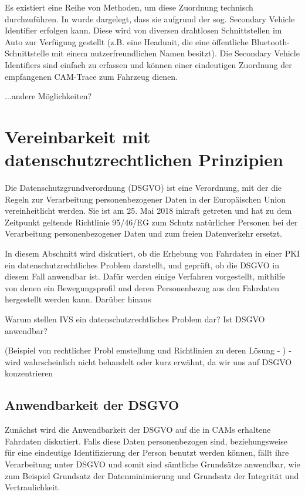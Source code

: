 Es existiert eine Reihe von Methoden, um diese Zuordnung technisch durchzuführen. In \cite{Ullmann2016} wurde dargelegt, dass sie aufgrund der sog. Secondary Vehicle Identifier erfolgen kann. Diese wird von diversen drahtlosen Schnittstellen im Auto zur Verfügung gestellt (z.B. eine Headunit, die eine öffentliche Bluetooth-Schnittstelle mit einem nutzerfreundlichen Namen besitzt). Die Secondary Vehicle Identifiers sind einfach zu erfassen und können einer eindeutigen Zuordnung der empfangenen CAM-Trace zum Fahrzeug dienen. 


...andere Möglichkeiten?


\section{Vereinbarkeit mit datenschutzrechtlichen Prinzipien}
\label{ch:SecondContentSection}

Die Datenschutzgrundverordnung (DSGVO) ist eine Verordnung, mit der die Regeln zur Verarbeitung personenbezogener Daten in der Europäischen Union vereinheitlicht werden. Sie ist am 25. Mai 2018 inkraft getreten und hat zu dem Zeitpunkt geltende Richtlinie 95/46/EG zum Schutz natürlicher Personen bei der Verarbeitung personenbezogener Daten und zum freien Datenverkehr ersetzt. 

In diesem Abschnitt wird diskutiert, ob die Erhebung von Fahrdaten in einer PKI ein datenschutzrechtliches Problem darstellt, und geprüft, ob die DSGVO in diesem Fall anwendbar ist. Dafür werden einige Verfahren vorgestellt, mithilfe von denen ein Bewegungsprofil und deren Personenbezug aus den Fahrdaten hergestellt werden kann. Darüber hinaus 

Warum stellen IVS ein datenschutzrechtliches Problem dar? Ist DSGVO anwendbar? 

(Beispiel von rechtlicher Probl	emstellung und Richtlinien zu deren Lösung - \cite{EUCooperativeV2X} ) - wird wahrscheinlich nicht behandelt oder kurz erwähnt, da wir uns auf DSGVO konzentrieren

\subsection{Anwendbarkeit der DSGVO}
\label{sec:SecondContentSection:SecondSubsection}

Zunächst wird die Anwendbarkeit der DSGVO auf die in CAMs erhaltene Fahrdaten diskutiert. Falls diese Daten personenbezogen sind, beziehungsweise für eine eindeutige Identifizierung der Person benutzt werden können, fällt ihre Verarbeitung unter DSGVO und somit sind sämtliche Grundsätze anwendbar, wie zum Beispiel Grundsatz der Datenminimierung und Grundsatz der Integrität und Vertraulichkeit. 

